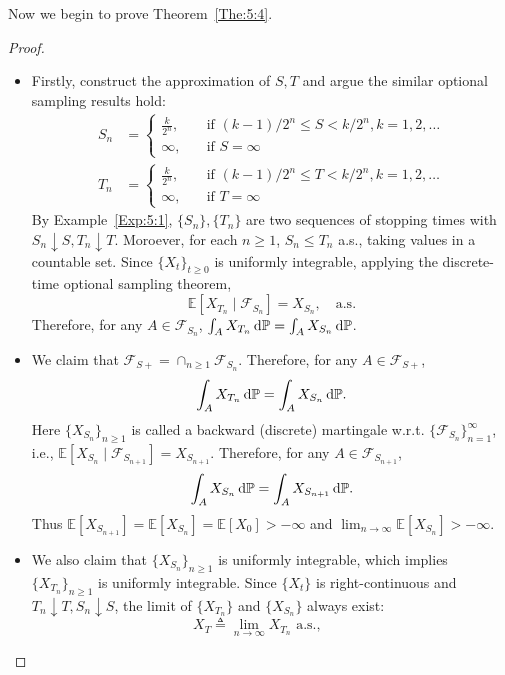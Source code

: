 Now we begin to prove Theorem~\ref{The:5:4}.
\begin{proof}
\begin{itemize}
\item
Firstly, construct the approximation of $S,T$ and argue the similar optional sampling results hold:
\begin{align*}
S_n &= \left\{
\begin{aligned}
\frac{k}{2^n},&\quad\text{if $(k-1)/2^n\le S<k/2^n, k=1,2,\ldots$}\\
\infty,&\quad\text{if $S=\infty$}
\end{aligned}
\right.
\\
T_n &= \left\{
\begin{aligned}
\frac{k}{2^n},&\quad\text{if $(k-1)/2^n\le T<k/2^n, k=1,2,\ldots$}\\
\infty,&\quad\text{if $T=\infty$}
\end{aligned}
\right.
\end{align*}
By Example~\ref{Exp:5:1}, $\{S_n\},\{T_n\}$ are two sequences of stopping times with
$S_n\downarrow S, T_n\downarrow T$.
Moroever, for each $n\ge1$, $S_n\le T_n$ a.s., taking values in a countable set.
Since $\{X_t\}_{t\ge0}$ is uniformly integrable, applying the discrete-time optional sampling theorem,
\[
\mathbb{E}[X_{T_n}\mid\mathcal{F}_{S_n}] = X_{S_n},\quad\text{a.s.}
\]
Therefore, for any $A\in\mathcal{F}_{S_n}$, $\int_AX_{T_n}\,\mathrm{d}\mathbb{P}=\int_AX_{S_n}\,\mathrm{d}\mathbb{P}$.
\item
We claim that $\mathcal{F}_{S+}=\cap_{n\ge1}\mathcal{F}_{S_n}$.
Therefore, for any $A\in\mathcal{F}_{S+}$,
\begin{equation}\label{Eq:5:4}
\int_AX_{T_n}\diff\mathbb{P}=\int_AX_{S_n}\diff\mathbb{P}.
\end{equation}
Here $\{X_{S_n}\}_{n\ge1}$ is called a backward (discrete) martingale w.r.t. $\{\mathcal{F}_{S_n}\}_{n=1}^\infty$, i.e., $\mathbb{E}[X_{S_n}\mid\mathcal{F}_{S_{n+1}}] = X_{S_{n+1}}$.
Therefore, for any $A\in\mathcal{F}_{S_{n+1}}$,
\[
\int_AX_{S_n}\,\mathrm{d}\mathbb{P} = \int_AX_{S_{n+1}}\,\mathrm{d}\mathbb{P}.
\]
Thus $\mathbb{E}[X_{S_{n+1}}] = \mathbb{E}[X_{S_n}] = \mathbb{E}[X_0]>-\infty$ and $\lim_{n\to\infty}\mathbb{E}[X_{S_n}]>-\infty$.
\item
We also claim that $\{X_{S_n}\}_{n\ge1}$ is uniformly integrable, which implies
$\{X_{T_n}\}_{n\ge1}$ is uniformly integrable.
Since $\{X_t\}$ is right-continuous and $T_n\downarrow T, S_n\downarrow S$, the limit of $\{X_{T_n}\}$ and $\{X_{S_n}\}$ always exist:
\[
X_T\triangleq \lim_{n\to\infty}X_{T_n} \text{ a.s.},\qquad
\]
\end{itemize}
\end{proof}
